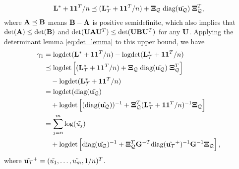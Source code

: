 \documentclass{article}
\begin{document}
\[
  {\bf L}^*+{\bf 1}{\bf 1}^T/n \preceq ({\bf L}_{\cal T}^*+{\bf 1}{\bf 1}^T/n)+\hbox{\boldmath$\Xi$}_{\cal Q}\;\text{diag}(\tilde{{\bf u}_{\cal Q}})\;\hbox{\boldmath$\Xi$}_{\cal Q}^T,
\]
where ${\bf A}\preceq{\bf B}$ means ${\bf B}-{\bf A}$ is positive semidefinite, which also implies that ${\hbox{det}}({\bf A})\leq{\hbox{det}}({\bf B})$ and ${\hbox{det}}({\bf U}{\bf A}{\bf U}^T)\leq{\hbox{det}}({\bf U}{\bf B}{\bf U}^T)$ for any ${\bf U}$.
Applying the determinant lemma \eqref{eq:det_lemma} to this upper bound, we have
\begin{align}
  \gamma_1&=\text{logdet}({\bf L}^*+{\bf 1}{\bf 1}^T/n)-\text{logdet}({\bf L}_{\cal T}^*+{\bf 1}{\bf 1}^T/n) \nonumber\\
  &\preceq \text{logdet}\left[({\bf L}_{\cal T}^*+{\bf 1}{\bf 1}^T/n)+\hbox{\boldmath$\Xi$}_{\cal Q}\;\text{diag}(\tilde{{\bf u}_{\cal Q}})\;\hbox{\boldmath$\Xi$}_{\cal Q}^T\right]\nonumber\\
  &\quad -\text{logdet}({\bf L}_{\cal T}^*+{\bf 1}{\bf 1}^T/n) \nonumber\\
  &=\text{logdet}(\text{diag}(\tilde{{\bf u}_{\cal Q}})\nonumber\\
  &\quad +\text{logdet}\left[(\text{diag}(\tilde{{\bf u}_{\cal Q}}))^{-1}+\hbox{\boldmath$\Xi$}_{\cal Q}^T({\bf L}_{\cal T}^*+{\bf 1}{\bf 1}^T/n)^{-1}\hbox{\boldmath$\Xi$}_{\cal Q}\right] \nonumber\\
\label{eq:gamma1}
  &=\sum_{j=n}^m \log(\tilde{u_j})\nonumber\\
  &\quad+\text{logdet}\left[\text{diag}(\tilde{{\bf u}_{\cal Q}})^{-1}+\hbox{\boldmath$\Xi$}_{\cal Q}^T{\bf G}^{-T}\text{diag}(\tilde{{\bf u}_{\cal T}}^+)^{-1}{\bf G}^{-1}\hbox{\boldmath$\Xi$}_{\cal Q}\right],
\end{align}
where $\tilde{{\bf u}_{\cal T}}^+=(\tilde{u_1},\dots,\tilde{u_m},1/n)^T$.
\end{document}
